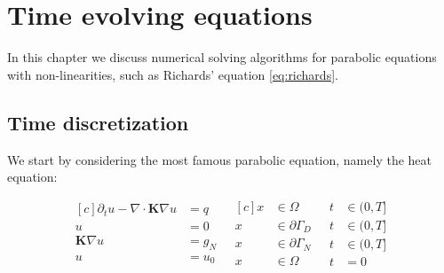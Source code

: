 \documentclass[../Main/main.tex]{subfiles}
\begin{document}
	\graphicspath{{../Time dependent equations/figs/}}
	\chapter{Time evolving equations}
	In this chapter we discuss numerical solving algorithms for parabolic equations with non-linearities, such as Richards' equation \eqref{eq:richards}. 
	\section*{Time discretization}
	We start by considering the most famous parabolic equation, namely the heat equation:
	
	\begin{equation}\label{eq:heat equation}
		\begin{aligned}[c]
			\partial_t u - \nabla \cdot \pmb{K} \nabla u &= q \\
			u &= 0 \\
			\pmb{K}\nabla u &= g_N\\
			u &= u_0
		\end{aligned}
		\ \ \
		\begin{aligned}[c]
			x &\in \Omega  \\
			x &\in \partial \Gamma_D \\
			x &\in \partial \Gamma_N \\
			x &\in \Omega  
		\end{aligned}
		\ \ \
		\begin{aligned}
			t&\in (0,T] \\
			t&\in (0,T] \\
			t&\in (0,T] \\
			t&=0
		\end{aligned}
	\end{equation}
	
\end{document}
